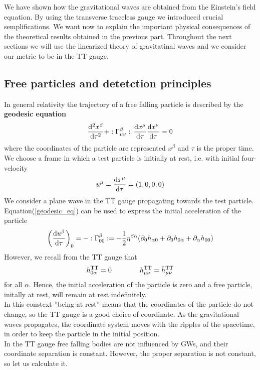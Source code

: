 We have shown how the gravitational waves are obtained from the Einstein's field equation. 
By using the transverse traceless gauge we introduced crucial semplifications. 
We want now to explain the important physical consequences of the theoretical results obtained in the previous part.
Throughout the next sections we will use the linearized theory of gravitatinal waves and we consider our metric to be in the TT gauge.
\subsection{Free particles and detetction principles}
In general relativity the trajectory of a free falling particle is described by the \textbf{geodesic equation}
\begin{equation}
\label{geodesic_eq}
\dv[2]{x^{\beta}}{\tau} + :\Gamma^{\beta} _{\mu \nu}: \,\dv{x^{\mu}}{\tau} \dv{x^{\nu}}{\tau} = 0
\end{equation}
where the coordinates of the particle are represented $x^{\beta}$ and $\tau$ is the proper time.\\
We choose a frame in which a test particle is initially at rest, i.e. with initial four-velocity
\[
u^{\mu} = \dv{x^{\mu}}{\tau} = (1,0,0,0)
\]
We consider a plane wave in the TT gauge propagating towards the test particle. \\
Equation(\ref{geodesic_eq}) can be used to express the initial acceleration of the particle
\[
\qty(
\dv{u^{\beta}}{\tau} 
)_{0}
=
- :\Gamma^{\beta} _{0 0}: 
= -\dfrac{1}{2} \eta ^{\beta \alpha}
\qty(
\partial_{0} h_{\alpha 0} + 
\partial_{0} h_{0 \alpha} + 
\partial_{\alpha} h_{0 0}
)
\]
However, we recall from the TT gauge that
\[
h^{\text{TT}}_{0 \alpha} = 0 \qquad  \qquad h^{\text{TT}}_{\mu \nu} = \bar{h}^{\text{TT}}_{\mu \nu} 
\]
for all $\alpha$. Hence, the initial acceleration of the particle is zero and a free particle, initally at rest, will remain at rest indefinitely.\\
In this constext ''being at rest'' means that the coordinates of the particle do not change, so the TT gauge is a good choice of coordinate. As the gravitational waves propagates, the coordinate system moves with the ripples of the spacetime, in order to keep the particle in the initial position. \\
In the TT gauge free falling bodies are not influenced by  GWs, and their coordinate separation is constant. However, the proper separation is not constant, so let us calculate it.\\
